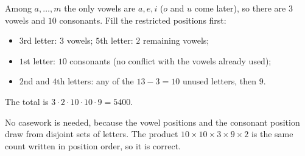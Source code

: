 Among $a,\dots,m$ the only vowels are $a,e,i$ ($o$ and $u$ come later), so there are $3$ vowels and $10$ consonants. Fill the restricted positions first:
\begin{itemize}
\item $3$rd letter: $3$ vowels; $5$th letter: $2$ remaining vowels;
\item $1$st letter: $10$ consonants (no conflict with the vowels already used);
\item $2$nd and $4$th letters: any of the $13-3=10$ unused letters, then $9$.
\end{itemize}
The total is $3\cdot2\cdot10\cdot10\cdot9=\boxed{5400}$.

No casework is needed, because the vowel positions and the consonant position draw from disjoint sets of letters. The product $10\times10\times3\times9\times2$ is the same count written in position order, so it is correct.
